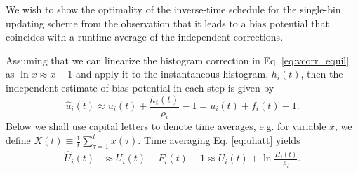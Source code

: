 \documentclass[reprint, superscriptaddress, floatfix]{revtex4-1}
\begin{document}
We wish to show the optimality of the inverse-time schedule
for the single-bin updating scheme
from the observation that
it leads to a bias potential
that coincides with a runtime average
of the independent corrections.
%

%
Assuming that we can linearize the histogram correction
in Eq. \eqref{eq:vcorr_equil} as
$\ln x \approx x - 1$ %
and apply it to the instantaneous histogram, $h_i(t)$,
then the independent estimate of bias potential in each step
is given by
%
\begin{equation}
  \hat u_i(t) \approx u_i(t) + \frac{ h_i(t) } { \rho_i } - 1
  = u_i(t) + f_i(t) - 1
  .
  \label{eq:uhatt}
\end{equation}
%
Below we shall use capital letters to denote
time averages, e.g. for variable $x$, we define
$X(t) \equiv \frac{1}{t} \sum_{\tau=1}^t x(\tau)$.
%
Time averaging Eq. \eqref{eq:uhatt} yields
\begin{align}
  \hat U_i(t)
  &\approx
  U_i (t)
  + F_i(t) - 1
  \approx
  U_i(t)
  + \ln \frac{ H_i(t) } { \rho_i }
  .
  \label{eq:uhatav}
\end{align}
\end{document}
